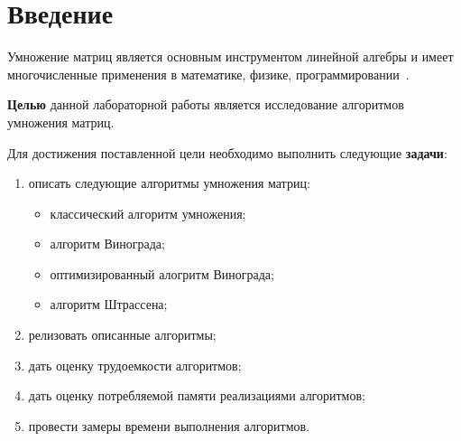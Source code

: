 \chapter*{Введение}

Умножение матриц является основным инструментом линейной алгебры и имеет многочисленные применения в математике, физике, программировании~\cite{vinograd-haskell}. 

\textbf{Целью} данной лабораторной работы является исследование алгоритмов умножения матриц.

Для достижения поставленной цели необходимо выполнить следующие \textbf{задачи}:
\begin{enumerate}[label={\arabic*)}]
    \item описать следующие алгоритмы умножения матриц:
        \begin{itemize}
            \item классический алгоритм умножения;
            \item алгоритм Винограда;
            \item оптимизированный алогритм Винограда;
            \item алгоритм Штрассена;
        \end{itemize}
    \item релизовать описанные алгоритмы;
    \item дать оценку трудоемкости алгоритмов;
    \item дать оценку потребляемой памяти реализациями алгоритмов;
    \item провести замеры времени выполнения алгоритмов.
\end{enumerate}

